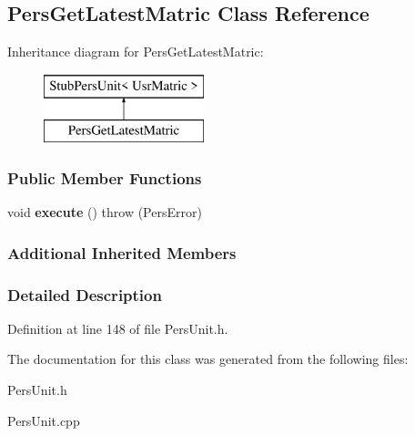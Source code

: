 \hypertarget{classPersGetLatestMatric}{\subsection{Pers\-Get\-Latest\-Matric Class Reference}
\label{de/d05/classPersGetLatestMatric}
}
Inheritance diagram for Pers\-Get\-Latest\-Matric\-:\begin{figure}[H]
\begin{center}
\leavevmode
\includegraphics[height=2.000000cm]{de/d05/classPersGetLatestMatric}
\end{center}
\end{figure}
\subsubsection*{Public Member Functions}
\begin{DoxyCompactItemize}
\item 
\hypertarget{classPersGetLatestMatric_aef898ecbe507a95af50cd77dbb48620e}{void {\bfseries execute} ()  throw (\-Pers\-Error)}\label{de/d05/classPersGetLatestMatric_aef898ecbe507a95af50cd77dbb48620e}

\end{DoxyCompactItemize}
\subsubsection*{Additional Inherited Members}


\subsubsection{Detailed Description}


Definition at line 148 of file Pers\-Unit.\-h.



The documentation for this class was generated from the following files\-:\begin{DoxyCompactItemize}
\item 
Pers\-Unit.\-h\item 
Pers\-Unit.\-cpp\end{DoxyCompactItemize}
